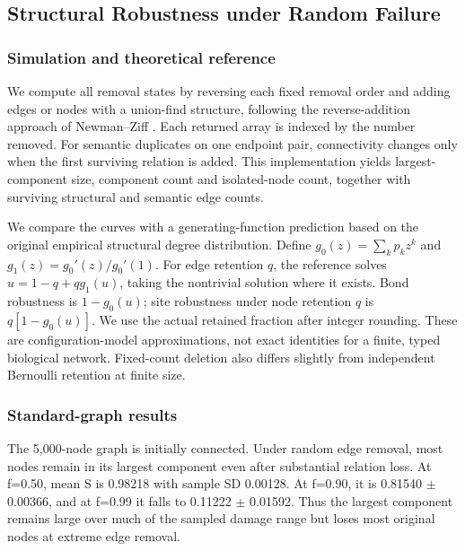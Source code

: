 \subsection{Structural Robustness under Random Failure}
\label{sec:random-failure}

\subsubsection{Simulation and theoretical
reference}\label{simulation-and-theoretical-reference}

We compute all removal states by reversing each fixed removal order and
adding edges or nodes with a union-find structure, following the
reverse-addition approach of Newman--Ziff \cite{newman2000efficient}. Each returned array
is indexed by the number removed. For semantic duplicates on one
endpoint pair, connectivity changes only when the first surviving
relation is added. This implementation yields largest-component size,
component count and isolated-node count, together with surviving
structural and semantic edge counts.

We compare the curves with a generating-function prediction based on the
original empirical structural degree distribution. Define
$g_0(z)=\sum_k p_k z^k$ and $g_1(z)=g_0'(z)/g_0'(1)$. For edge retention
$q$, the reference solves $u=1-q+qg_1(u)$, taking the nontrivial solution
where it exists. Bond robustness is $1-g_0(u)$; site robustness under node
retention $q$ is $q[1-g_0(u)]$. We use the actual retained fraction after
integer rounding. These are configuration-model approximations, not exact
identities for a finite, typed biological network. Fixed-count deletion
also differs slightly from independent Bernoulli retention at finite size.

\subsubsection{Standard-graph results}\label{standard-graph-results}

The 5,000-node graph is initially connected. Under random edge removal,
most nodes remain in its largest component even after substantial
relation loss. At f=0.50, mean S is 0.98218 with sample SD 0.00128. At
f=0.90, it is 0.81540 $\pm$ 0.00366, and at f=0.99 it falls to 0.11222 $\pm$
0.01592. Thus the largest component remains large over much of the
sampled damage range but loses most original nodes at extreme edge
removal.

